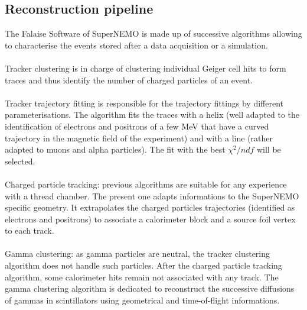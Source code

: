 \subsection{Reconstruction pipeline}

The Falaise Software of SuperNEMO is made up of successive algorithms allowing to characterise the events stored after a data acquisition or a simulation.
\paragraph{} Tracker clustering is in charge of clustering individual Geiger cell hits to form traces and thus identify the number of charged particles of an event.
\paragraph{} Tracker trajectory fitting is responsible for the trajectory fittings by different parameterisations.
The algorithm fits the traces with a helix (well adapted to the identification of electrons and positrons of a few MeV that have a curved trajectory in the magnetic field of the experiment) and with a line (rather adapted to muons and alpha particles).
The fit with the best $\chi^{2}/ndf$ will be selected.
\paragraph{} Charged particle tracking: previous algorithms are suitable for any experience with a thread chamber.
The present one adapts informations to the SuperNEMO specific geometry.
It extrapolates the charged particles trajectories (identified as electrons and positrons) to associate a calorimeter block and a source foil vertex to each track.
\paragraph{} Gamma clustering: as gamma particles are neutral, the tracker clustering algorithm does not handle such particles.
After the charged particle tracking algorithm, some calorimeter hits remain not associated with any track.
The gamma clustering algorithm is dedicated to reconstruct the successive diffusions of gammas in scintillators using geometrical and time-of-flight informations.
